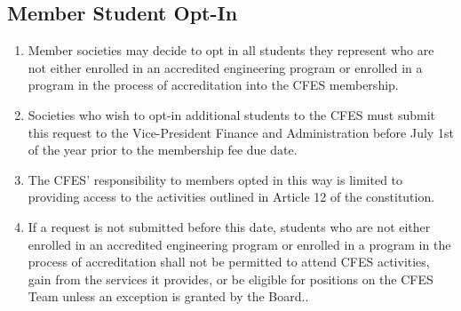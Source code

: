 \subsection{Member Student Opt-In}
\label{member-student-opt-in}

\begin{enumerate}
 \item
  Member societies may decide to opt in all students they represent who are not either enrolled in an accredited engineering program or enrolled in a program in the process of accreditation into the CFES membership.
 \item
  Societies who wish to opt-in additional students to the CFES must submit this request to the Vice-President Finance and Administration before July 1st of the year prior to the membership fee due date.
 \item
  The CFES' responsibility to members opted in this way is limited to providing access to the activities outlined in Article 12 of the constitution.
 \item
  If a request is not submitted before this date, students who are not either enrolled in an accredited engineering program or enrolled in a program in the process of accreditation shall not be permitted to attend CFES activities, gain from the services it provides, or be eligible for positions on the CFES Team unless an exception is granted by the Board..
\end{enumerate}

